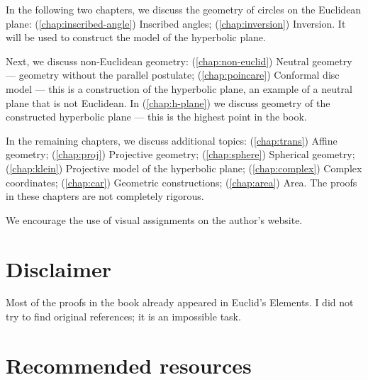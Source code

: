 In the following two chapters, we discuss the geometry of circles on the Euclidean plane:
(\ref{chap:inscribed-angle}) Inscribed angles; (\ref{chap:inversion}) Inversion.
It  will be used to construct the model of the hyperbolic plane.

Next, we discuss non-Euclidean geometry:
(\ref{chap:non-euclid})
Neutral geometry --- geometry without the parallel postulate;
(\ref{chap:poincare})
Conformal disc model ---
this is a construction of the hyperbolic plane,
an example of a neutral plane that is not Euclidean.
In (\ref{chap:h-plane}) we discuss geometry of the constructed hyperbolic plane --- this is the highest point in the book.

In the remaining chapters, we discuss additional topics:
(\ref{chap:trans}) Affine geometry;
(\ref{chap:proj}) Projective geometry;
(\ref{chap:sphere}) Spherical geometry;
(\ref{chap:klein}) Projective model of the hyperbolic plane;
(\ref{chap:complex}) Complex coordinates;
(\ref{chap:car}) Geometric constructions;
(\ref{chap:area}) Area.
The proofs in these chapters are not completely rigorous.

We encourage the use of visual assignments on the author's website.

\section{Disclaimer}
 
Most of the proofs in the book already appeared in Euclid's Elements.
I did not try to find original references; it is an impossible task.

\section{Recommended resources}

